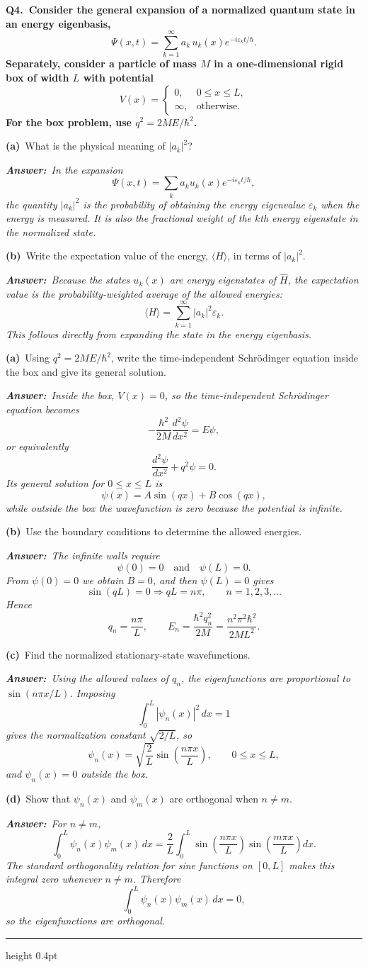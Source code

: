 \documentclass[11pt]{article}
\newcommand{\QuestionStyle}[1]{{\large\bfseries\boldmath #1}}
\newcommand{\MPBlock}[3]{%
  \Needspace{8\baselineskip}%
  \noindent
  \begin{minipage}{\linewidth}
    \QuestionStyle{#1.~#2}

    \vspace{0.25em}
    #3

    \vspace{0.25em}
    \hrule height 0.4pt
  \end{minipage}
  \vspace{0.75em}
}
\newcommand{\OEPart}[3]{%
  \par\vspace{0.35em}
  \noindent\textbf{(#1)}~#2
  \par\vspace{0.15em}
  \noindent\textit{\textbf{Answer:}~#3}
  \par
}
\begin{document}
\MPBlock{Q4}{Consider the general expansion of a normalized quantum state in an energy eigenbasis,
\[
\Psi(x,t)=\sum_{k=1}^{\infty} a_k\,u_k(x)e^{-i\varepsilon_k t/\hbar}.
\]
Separately, consider a particle of mass $M$ in a one-dimensional rigid box of width $L$ with potential
\[
V(x)=\begin{cases}0,&0\le x\le L,\\ \infty,&\text{otherwise.}\end{cases}
\]
For the box problem, use $q^2=2ME/\hbar^2$.}{%
\OEPart{a}{What is the physical meaning of $|a_k|^2$?}{In the expansion
\[
\Psi(x,t)=\sum_k a_k u_k(x)e^{-i\varepsilon_k t/\hbar},
\]
the quantity $|a_k|^2$ is the probability of obtaining the energy eigenvalue $\varepsilon_k$ when the energy is measured. It is also the fractional weight of the $k$th energy eigenstate in the normalized state.}
\OEPart{b}{Write the expectation value of the energy, $\langle H\rangle$, in terms of $|a_k|^2$.}{Because the states $u_k(x)$ are energy eigenstates of $\hat H$, the expectation value is the probability-weighted average of the allowed energies:
\[
\langle H\rangle=\sum_{k=1}^{\infty}|a_k|^2\varepsilon_k.
\]
This follows directly from expanding the state in the energy eigenbasis.}
\OEPart{a}{Using $q^2=2ME/\hbar^2$, write the time-independent Schr\"odinger equation inside the box and give its general solution.}{Inside the box, $V(x)=0$, so the time-independent Schr\"odinger equation becomes
\[
-\frac{\hbar^2}{2M}\frac{d^2\psi}{dx^2}=E\psi,
\]
or equivalently
\[
\frac{d^2\psi}{dx^2}+q^2\psi=0.
\]
Its general solution for $0\le x\le L$ is
\[
\psi(x)=A\sin(qx)+B\cos(qx),
\]
while outside the box the wavefunction is zero because the potential is infinite.}
\OEPart{b}{Use the boundary conditions to determine the allowed energies.}{The infinite walls require
\[
\psi(0)=0\quad\text{and}\quad \psi(L)=0.
\]
From $\psi(0)=0$ we obtain $B=0$, and then $\psi(L)=0$ gives
\[
\sin(qL)=0\Rightarrow qL=n\pi,\qquad n=1,2,3,\dots
\]
Hence
\[
q_n=\frac{n\pi}{L},\qquad E_n=\frac{\hbar^2 q_n^2}{2M}=\frac{n^2\pi^2\hbar^2}{2ML^2}.
\]}
\OEPart{c}{Find the normalized stationary-state wavefunctions.}{Using the allowed values of $q_n$, the eigenfunctions are proportional to $\sin(n\pi x/L)$. Imposing
\[
\int_0^L |\psi_n(x)|^2\,dx=1
\]
gives the normalization constant $\sqrt{2/L}$, so
\[
\psi_n(x)=\sqrt{\frac{2}{L}}\sin\left(\frac{n\pi x}{L}\right),\qquad 0\le x\le L,
\]
and $\psi_n(x)=0$ outside the box.}
\OEPart{d}{Show that $\psi_n(x)$ and $\psi_m(x)$ are orthogonal when $n\ne m$.}{For $n\ne m$,
\[
\int_0^L \psi_n(x)\psi_m(x)\,dx=\frac{2}{L}\int_0^L \sin\left(\frac{n\pi x}{L}\right)\sin\left(\frac{m\pi x}{L}\right)dx.
\]
The standard orthogonality relation for sine functions on $[0,L]$ makes this integral zero whenever $n\ne m$. Therefore
\[
\int_0^L \psi_n(x)\psi_m(x)\,dx=0,
\]
so the eigenfunctions are orthogonal.}
}
\end{document}
